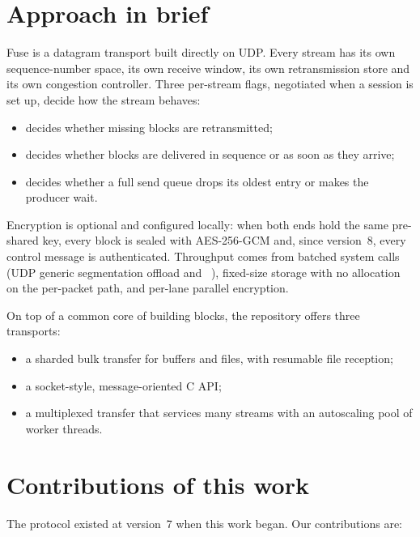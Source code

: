\section{Approach in brief}

Fuse is a datagram transport built directly on UDP. Every stream has its own sequence-number space, its own
receive window, its own retransmission store and its own congestion controller. Three per-stream flags,
negotiated when a session is set up, decide how the stream behaves:
\begin{itemize}
  \item {} decides whether missing blocks are retransmitted;
  \item {} decides whether blocks are delivered in sequence or as soon as they arrive;
  \item {} decides whether a full send queue drops its oldest entry or makes the producer wait.
\end{itemize}

Encryption is optional and configured locally: when both ends hold the same pre-shared key, every block is
sealed with AES-256-GCM and, since version~8, every control message is authenticated. Throughput comes from
batched system calls (UDP generic segmentation offload and ~\cite{gso,recvmmsg}), fixed-size
storage with no allocation on the per-packet path, and per-lane parallel encryption.

On top of a common core of building blocks, the repository offers three transports:
\begin{itemize}
  \item a sharded bulk transfer for buffers and files, with resumable file reception;
  \item a socket-style, message-oriented C API;
  \item a multiplexed transfer that services many streams with an autoscaling pool of worker threads.
\end{itemize}

\section{Contributions of this work}

The protocol existed at version~7 when this work began. Our contributions are:

